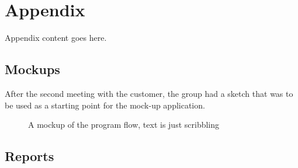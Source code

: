 \appendix

\chapter{Appendix}
Appendix content goes here.

\section{Mockups}
After the second meeting with the customer, the group had a sketch that was to be used as a starting point for the mock-up application.
\pagebreak
\begin{figure}[here]
\setlength\fboxsep{0pt}
\setlength\fboxrule{1pt}
\caption{A mockup of the program flow, text is just scribbling}
\label{fig:mockupV2}
\end{figure}


\section{Reports}
